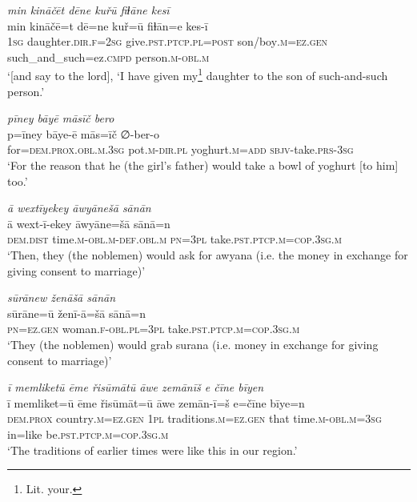 \ea \label{RE.49}
\textit{min kināčēt dēne kuřū fiɫāne kesī} \\ 
\gll min kināčē=t dē=ne kuř=ū fiɫān=e kes-ī \\ 
 \textsc{1sg} daughter\textsc{.dir}\textsc{.f}\textsc{=\textsc{2sg}} give\textsc{.pst}\textsc{.ptcp}\textsc{.pl}\textsc{=\textsc{post}} son/boy\textsc{.m}\textsc{=ez.gen} such\_and\_such=ez\textsc{.cmpd} person\textsc{.m}\textsc{-obl}\textsc{.m} \\ 
\glt `[and say to the lord], ‘I have given my\footnote{Lit. your.} daughter to the son of such-and-such person.'
\z 
 
\ea \label{RE.52}
\textit{pīney bāyē māsīč bero} \\ 
\gll p=īney bāye-ē mās=īč ∅-ber-o \\ 
 for=\textsc{dem.prox}\textsc{.obl}\textsc{.m}\textsc{.3sg} pot\textsc{.m}\textsc{-dir}\textsc{.pl} yoghurt\textsc{.m}\textsc{=add} \textsc{sbjv-}take\textsc{.prs}\textsc{-3sg} \\ 
\glt `For the reason that he (the girl’s father) would take a bowl of yoghurt [to him] too.'
\z 
 
\ea \label{RE.58}
\textit{ā wextīyekey āwyānešā sānān} \\ 
\gll ā wext-ī-ekey āwyāne=šā sānā=n \\ 
 \textsc{dem.dist} time\textsc{.m}\textsc{-obl}\textsc{.m}\textsc{-def}\textsc{.obl}\textsc{.m} \textsc{pn}\textsc{=3pl} take\textsc{.pst}\textsc{.ptcp}\textsc{.m}\textsc{=cop}\textsc{.3sg}\textsc{.m} \\ 
\glt `Then, they (the noblemen) would ask for awyana (i.e. the money in exchange for giving consent to marriage)'
\z 
 
\ea \label{RE.59}
\textit{sūrānew ženāšā sānān} \\ 
\gll sūrāne=ū ženī-ā=šā sānā=n \\ 
 \textsc{pn}\textsc{=ez.gen} woman\textsc{.f}\textsc{-obl}\textsc{.pl}\textsc{=3pl} take\textsc{.pst}\textsc{.ptcp}\textsc{.m}\textsc{=cop}\textsc{.3sg}\textsc{.m} \\ 
\glt `They (the noblemen) would grab surana (i.e. money in exchange for giving consent to marriage)'
\z 
 
\ea \label{RE.62}
\textit{ī memliketū ēme řisūmātū āwe zemānīš e čīne bīyen} \\ 
\gll ī memliket=ū ēme řisūmāt=ū āwe zemān-ī=š e=čīne bīye=n \\ 
 \textsc{dem.prox} country\textsc{.m}\textsc{=ez.gen} \textsc{1pl} traditions\textsc{.m}\textsc{=ez.gen} that time\textsc{.m}\textsc{-obl}\textsc{.m}\textsc{=3sg} in=like be\textsc{.pst}\textsc{.ptcp}\textsc{.m}\textsc{=cop}\textsc{.3sg}\textsc{.m} \\ 
\glt `The traditions of earlier times were like this in our region.'
\z 
 
